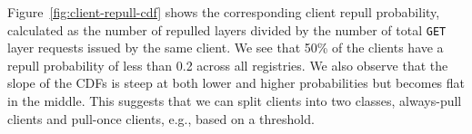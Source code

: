 %
Figure~\ref{fig:client-repull-cdf} shows the corresponding client repull probability,
calculated as the number of repulled layers divided by the
number of total \texttt{GET} layer requests issued by the same client.
%
We see that 50\% of the clients have a repull probability of less than 0.2
across all registries.
%
We also observe that the slope of the CDFs is steep at both lower and higher probabilities
but becomes flat in the middle.
%
This suggests that we can split clients into two classes, always-pull clients
and pull-once clients, e.g., based on a threshold.
%
%
%
%


%
%
%
%




